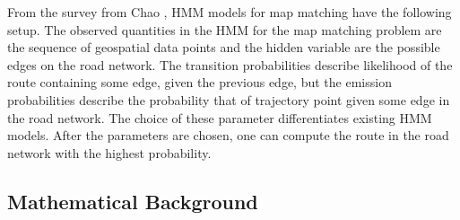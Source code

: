 \documentclass{article}
\numberwithin{equation}{section}
\theoremstyle{definition}
\begin{document}
From the survey from Chao \cite{C}, HMM models for map matching have the following setup. The observed quantities in the HMM for the map matching problem are the sequence of geospatial data points and the hidden variable are the possible edges on the road network. The transition probabilities describe likelihood of the route containing some edge, given the previous edge, but the emission probabilities describe the probability that of trajectory point given some edge in the road network. The choice of these parameter differentiates existing HMM models. After the parameters are chosen, one can compute the route in the road network with the highest probability.  









\subsection{Mathematical Background}


\end{document}
